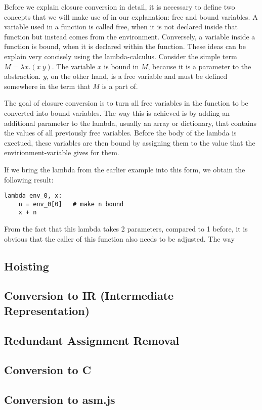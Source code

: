 \documentclass[11pt]{report}
\begin{document}
Before we explain closure conversion in detail, it is necessary to define two concepts that we will make use of in our explanation: free and bound variables. A variable used in a function is called free, when it is not declared inside that function but instead comes from the environment. Conversely, a variable inside a function is bound, when it is declared within the function. These ideas can be explain very concisely using the lambda-calculus. Consider the simple term $M = \lambda x.(x\ y)$. The variable $x$ is bound in $M$, because it is a parameter to the abstraction. $y$, on the other hand, is a free variable and must be defined somewhere in the term that $M$ is a part of.

The goal of closure conversion is to turn all free variables in the function to be converted into bound variables. The way this is achieved is by adding an additional parameter to the lambda, usually an array or dictionary, that contains the values of all previously free variables. Before the body of the lambda is exectued, these variables are then bound by assigning them to the value that the envirionment-variable gives for them.

If we bring the lambda from the earlier example into this form, we obtain the following result:

\begin{lstlisting}
lambda env_0, x: 
    n = env_0[0]   # make n bound
    x + n
\end{lstlisting}

From the fact that this lambda takes 2 parameters, compared to 1 before, it is obvious that the caller of this function also needs to be adjusted. The way 

\subsection{Hoisting}
\subsection{Conversion to IR (Intermediate Representation)}
\subsection{Redundant Assignment Removal}
\subsection{Conversion to C}
\subsection{Conversion to asm.js}
\end{document}
